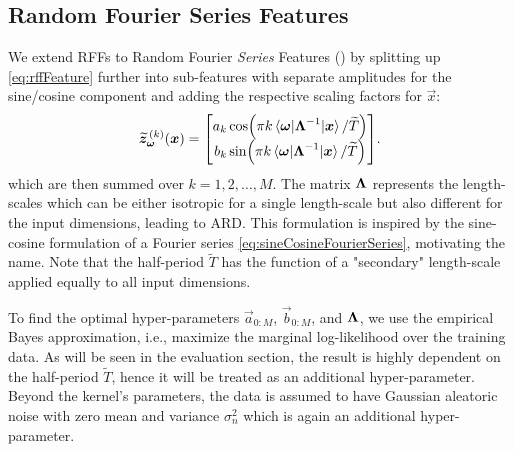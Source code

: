 \subsection{Random Fourier Series Features}
	We extend \acp{RFF} to Random Fourier \emph{Series} Features () by splitting up \cref{eq:rffFeature} further into sub-features with separate amplitudes for the sine/cosine component and adding the respective scaling factors for $\vec{x}$:
	\begin{equation}
		\widetilde{\bm{z}}_{\bm{\omega}}^{\,(k)}(\bm{x}) =
			\begin{bmatrix}
				a_k \cos(\pi k \mel{\bm{\omega}}{\bm{\mathrm{\Lambda}}^{-1}}{\bm{x}} / \widetilde{T}) \\
				b_k \sin(\pi k \mel{\bm{\omega}}{\bm{\mathrm{\Lambda}}^{-1}}{\bm{x}} / \widetilde{T})
			\end{bmatrix}\!.
	\end{equation}
	which are then summed over $k = 1, 2, \dots, M$.
	The matrix $\bm{\mathrm{\Lambda}}$ represents the length-scales which can be either isotropic for a single length-scale but also different for the input dimensions, leading to \ac{ARD}.
	This formulation is inspired by the sine-cosine formulation of a Fourier series \cref{eq:sineCosineFourierSeries}, motivating the name.
	Note that the half-period $\tilde{T}$ has the function of a "secondary" length-scale applied equally to all input dimensions.

	To find the optimal hyper-parameters $\vec{a}_{0:M}$, $\vec{b}_{0:M}$, and $\bm{\mathrm{\Lambda}}$, we use the empirical Bayes approximation\cite[p.\,165]{bishopPatternRecognitionMachine2006}, i.e., maximize the marginal log-likelihood over the training data.
	As will be seen in the evaluation section, the result is highly dependent on the half-period $\tilde{T}$, hence it will be treated as an additional hyper-parameter.  
	Beyond the kernel's parameters, the data is assumed to have Gaussian aleatoric noise with zero mean and variance $\sigma_n^2$ which is again an additional hyper-parameter.



